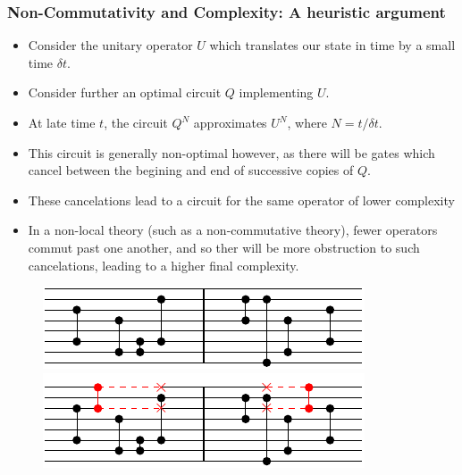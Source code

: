 \documentclass[8pt,aspectratio=169]{beamer}
\begin{document}
\begin{frame}
\frametitle{Non-Commutativity and Complexity: A heuristic argument}

\begin{minipage}[t]{0.5\linewidth}

\begin{itemize}

\item Consider the unitary operator $U$ which translates our state in time by a small time $\delta t$. 

\item Consider further an optimal circuit $Q$ implementing $U$.

\item At late time $t$, the circuit $Q^N$ approximates $U^N$, where $N= t/\delta t$.

\item This circuit is generally non-optimal however, as there will be gates which cancel between the begining and end of successive copies of $Q$.

\item These cancelations lead to a circuit for the same operator of lower complexity

\item In a non-local theory (such as a non-commutative theory), fewer operators commut past one another, and so ther will be more obstruction to such cancelations, leading to a higher final complexity.

\end{itemize}

\end{minipage}\hfill
%
\begin{minipage}[t]{0.48\linewidth}

\begin{figure}
    \begin{center}
    
        \includegraphics[scale=1]{animation/animation_4}    
        
        \vspace{2mm}
        
        \includegraphics[scale=1]{animation/animation_5}    
    

\end{center}
\end{figure}
\end{minipage}
\end{frame}
\end{document}
